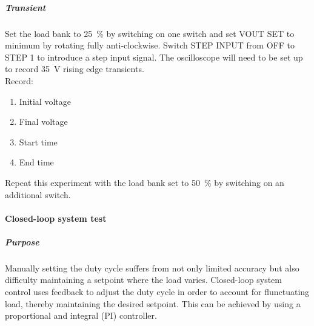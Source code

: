 \subparagraph{Transient}
Set the load bank to \qty{25}{\percent} by switching on one switch and set VOUT SET to minimum
by rotating fully anti-clockwise.
Switch STEP INPUT from OFF to STEP 1 to introduce a step input signal.
The oscilloscope will need to be set up to record \qty{35}{\volt} rising edge transients. \\
Record:
\begin{enumerate}
    \item Initial voltage
    \item Final voltage
    \item Start time
    \item End time
\end{enumerate}
Repeat this experiment with the load bank set to \qty{50}{\percent} by switching on an additional switch.

\paragraph{Closed-loop system test}
\subparagraph{Purpose}
Manually setting the duty cycle suffers from not only limited accuracy but also difficulty maintaining a setpoint where the load varies.
Closed-loop system control uses feedback to adjust the duty cycle in order to account for flunctuating load, thereby maintaining the
desired setpoint. This can be achieved by using a proportional and integral (PI) controller.

